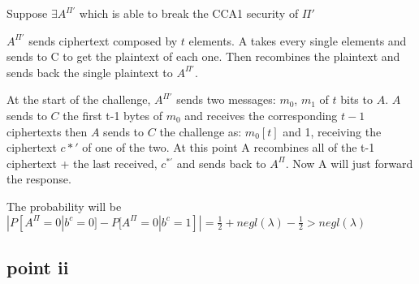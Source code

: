 Suppose $\exists A^{\Pi'}$ which is able to break the CCA1 security of $\Pi'$
\begin{figure}[h!]
    \centering
    \sdinit{}
\end{figure}


$A^{\Pi'}$ sends ciphertext composed by $t$ elements. A takes every single elements and sends to C to get the plaintext of each one.
Then recombines the plaintext and sends back the single plaintext to $A^{\Pi'}$.

At the start of the challenge, $A^{\Pi'}$ sends two messages: $m_0$, $m_1$ of $t$ bits to $A$.
$A$ sends to $C$ the first t-1 bytes of $m_0$ and receives the corresponding $t-1$ ciphertexts then $A$ sends to $C$ the challenge as: $m_0[t]$ and 1, receiving the ciphertext $c*'$ of one of the two.
At this point A recombines all of the t-1 ciphertext + the last received, $c^{*\prime}$ and sends back to $A^{\Pi}$.
Now A will just forward the response.

The probability will be $|P[A^{\Pi}=0 | b^c=0]-P[A^{\Pi}=0 | b^c=1]|=\frac{1}{2}+negl(\lambda)-\frac{1}{2}>negl(\lambda)$ 

\newpage
\subsection{point ii}


